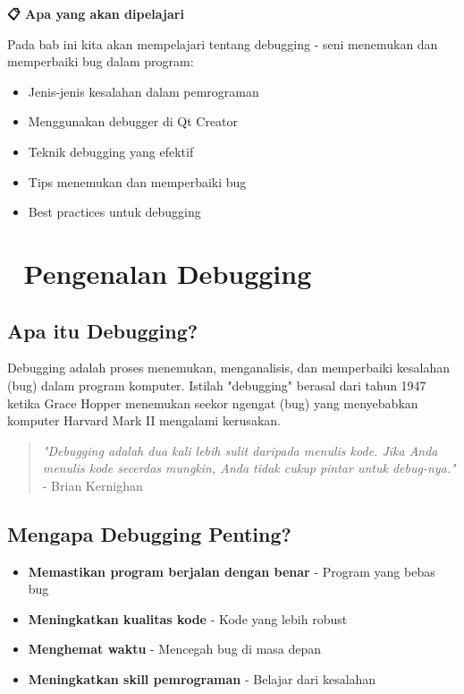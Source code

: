 \textbf{📋 Apa yang akan dipelajari}

Pada bab ini kita akan mempelajari tentang debugging - seni menemukan dan memperbaiki bug dalam program:

\begin{itemize}
\item Jenis-jenis kesalahan dalam pemrograman
\item Menggunakan debugger di Qt Creator
\item Teknik debugging yang efektif
\item Tips menemukan dan memperbaiki bug
\item Best practices untuk debugging
\end{itemize}

\minitoc

\section{🐛 Pengenalan Debugging}

\subsection{Apa itu Debugging?}

Debugging adalah proses menemukan, menganalisis, dan memperbaiki kesalahan (bug) dalam program komputer. Istilah "debugging" berasal dari tahun 1947 ketika Grace Hopper menemukan seekor ngengat (bug) yang menyebabkan komputer Harvard Mark II mengalami kerusakan.

\begin{quote}
\textit{"Debugging adalah dua kali lebih sulit daripada menulis kode. Jika Anda menulis kode secerdas mungkin, Anda tidak cukup pintar untuk debug-nya."} - Brian Kernighan
\end{quote}

\subsection{Mengapa Debugging Penting?}

\begin{itemize}
\item \textbf{Memastikan program berjalan dengan benar} - Program yang bebas bug
\item \textbf{Meningkatkan kualitas kode} - Kode yang lebih robust
\item \textbf{Menghemat waktu} - Mencegah bug di masa depan
\item \textbf{Meningkatkan skill pemrograman} - Belajar dari kesalahan
\end{itemize}

